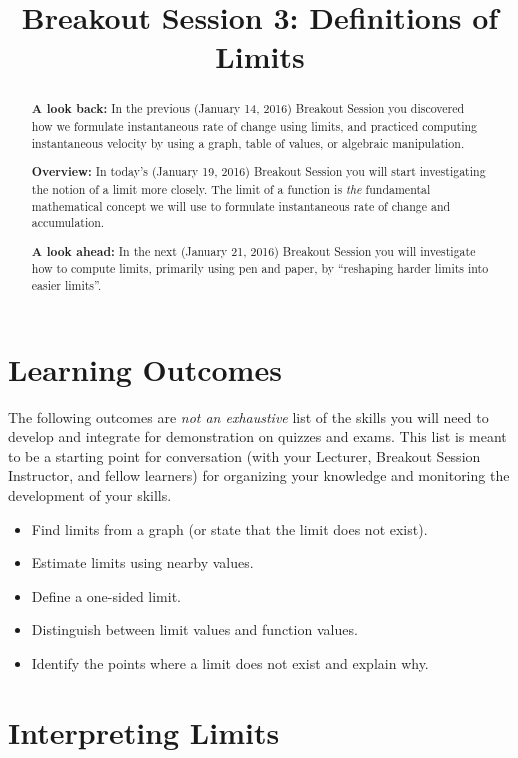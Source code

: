\documentclass[handout,nooutcomes]{ximera}
\title{Breakout Session 3: Definitions of Limits}
\begin{document}
\begin{abstract}
 \textbf{A look back:} In the previous (January 14, 2016) Breakout Session you discovered how we formulate instantaneous rate of change using limits, and practiced computing instantaneous velocity by using a graph, table of values, or algebraic manipulation.

 \textbf{Overview:} In today's (January 19, 2016) Breakout Session you will start investigating the notion of a limit more closely.
 The limit of a function is \emph{the} fundamental mathematical concept we will use to formulate instantaneous rate of change and accumulation.

  \textbf{A look ahead:} In the next (January 21, 2016) Breakout Session you will investigate how to compute limits, primarily using pen and paper, by ``reshaping harder limits into easier limits''.
\end{abstract}
\maketitle

\section{Learning Outcomes}
\label{section:learning-outcomes}
The following outcomes are \emph{not an exhaustive} list of the skills you will need to develop and integrate for demonstration on quizzes and exams.
This list is meant to be a starting point for conversation (with your Lecturer, Breakout Session Instructor, and fellow learners) for organizing your knowledge and monitoring the development of your skills.
\begin{itemize}
  \item 
    Find limits from a graph (or state that the limit does not exist).
  \item 
    Estimate limits using nearby values.
  \item 
    Define a one-sided limit.
  \item
    Distinguish between limit values and function values.
  \item 
    Identify the points where a limit does not exist and explain why.
\end{itemize}
\newpage
\section{Interpreting Limits}
\label{section:interpreting-limits}
\end{document}
